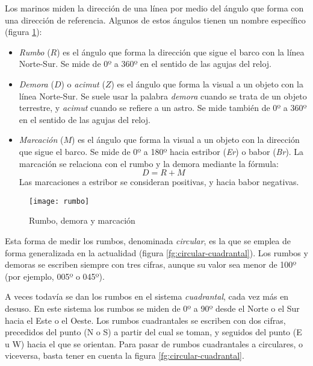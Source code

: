 Los marinos miden la dirección de una línea por medio del ángulo que forma con una dirección de referencia. Algunos de estos ángulos tienen un nombre específico (figura \ref{fg:rumbo-demora}):  
\begin{itemize}
\item \emph{Rumbo} ($R$) es el ángulo que forma la dirección que sigue el barco con la línea Norte-Sur. Se mide de 0º a 360º en el sentido de las agujas del reloj. 
\item  \emph{Demora} ($D$) o \emph{acimut} ($Z$) es el ángulo que forma la visual a un objeto con la línea Norte-Sur. Se suele usar la palabra \emph{demora} cuando se trata de un objeto terrestre, y \emph{acimut} cuando se refiere a un astro. Se mide también de 0º a 360º en el sentido de las agujas del reloj. 
\item \emph{Marcación} ($M$) es el ángulo que forma la visual a un objeto con la dirección que sigue el barco. Se mide de 0º a 180º hacia estribor (\emph{Er}) o babor (\emph{Br}).
La marcación se relaciona con el rumbo y la demora mediante la fórmula: 
\begin{equation}
D = R + M
\end{equation}
Las marcaciones a estribor se consideran positivas, y hacia babor negativas.
\end{itemize}

\begin{figure}[htbp]
\begin{center}
\texttt{[image: rumbo]}\\
\caption{Rumbo, demora y marcación}
\label{fg:rumbo-demora}
\end{center}
\end{figure}

Esta forma de medir los rumbos, denominada \emph{circular}, es la que se emplea de forma generalizada en la actualidad (figura \ref{fg:circular-cuadrantal}). Los rumbos y demoras se escriben siempre con tres cifras, aunque su valor sea menor de 100º (por ejemplo, 005º o 045º).  

A veces todavía se dan los rumbos en el sistema \emph{cuadrantal}, cada vez más en desuso. En este sistema los rumbos se miden de 0º a 90º desde el Norte o el Sur hacia el Este o el Oeste. Los rumbos cuadrantales se escriben con dos cifras, precedidos del punto (N o S) a partir del cual se toman, y seguidos del punto (E u W) hacia el que se orientan. Para pasar de rumbos cuadrantales a circulares, o viceversa, basta tener en cuenta la figura  \ref{fg:circular-cuadrantal}.

